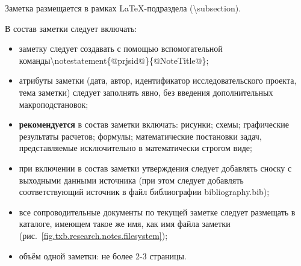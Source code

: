 ﻿%
\def\notedate{2021.09.19}
\def\currentauthor{Соколов А.П. (РК6)}

Заметка размещается в рамках \LaTeX-подраздела (\textsf{\textbackslash subsection}).

В состав заметки следует включать:
\begin{itemize}
	\item заметку следует создавать с помощью вспомогательной команды\newline \textsf{\textbackslash notestatement\{@prjsid@\}\{@NoteTitle@\}};
	\item атрибуты заметки (дата, автор, идентификатор исследовательского проекта, тема заметки) следует заполнять явно, без введения дополнительных макроподстановок;
	\item \textbf{рекомендуется} в состав заметки включать: рисунки; схемы; графические результаты расчетов; формулы; математические постановки задач, представляемые исключительно в математически строгом виде;
	\item при включении в состав заметки утверждения следует добавлять сноску с выходными данными источника (при этом следует добавлять соответствующий источник в файл библиографии \textsf{bibliography.bib});
	\item все сопроводительные документы по текущей заметке следует размещать в каталоге, имеющем такое же имя, как имя файла заметки (рис.~\ref{fig.txb.research.notes.filesystem});
	\item объём одной заметки: не более 2-3 страницы.
\end{itemize}

